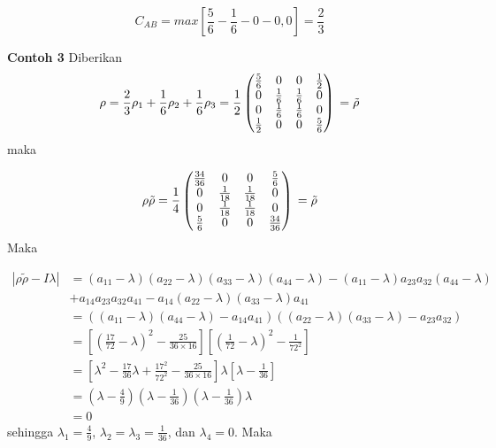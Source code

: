 \begin{equation}
	C_{AB}=max[\frac{5}{6}-\frac{1}{6}-0-0,0]=\frac{2}{3}
\end{equation}

\textbf{Contoh 3}
Diberikan
\begin{equation}
	\rho = \frac{2}{3}\rho_1 + \frac{1}{6}\rho_2
	+\frac{1}{6}\rho_3\\
	=\frac{1}{2}
	\begin{pmatrix}
		\frac{5}{6}&0&0&\frac{1}{2}\\
		0&\frac{1}{6}&\frac{1}{6}&0\\
		0&\frac{1}{6}&\frac{1}{6}&0\\
		\frac{1}{2}&0&0&\frac{5}{6}
	\end{pmatrix}\\
	=\tilde{\rho}
\end{equation}
maka 

\begin{equation}
	\rho \tilde{\rho} =\frac{1}{4}
	\begin{pmatrix}
		\frac{34}{36}&0&0&\frac{5}{6}\\
		0&\frac{1}{18}&\frac{1}{18}&0\\
		0&\frac{1}{18}&\frac{1}{18}&0\\
		\frac{5}{6}&0&0&\frac{34}{36}
	\end{pmatrix}\\
	=\tilde{\rho}
\end{equation}
Maka

\begin{equation}
	\begin{aligned}
		|\rho \tilde{\rho}-I\lambda|
		&=(a_{11}-\lambda)(a_{22}-\lambda)(a_{33}-\lambda)(a_{44}-\lambda)-(a_{11}-\lambda)a_{23}a_{32}(a_{44}-\lambda)\\
		&+a_{14}a_{23}a_{32}a_{41}-a_{14}(a_{22}-\lambda)(a_{33}-\lambda)a_{41}\\
		&=((a_{11}-\lambda)(a_{44}-\lambda)-a_{14}a_{41})((a_{22}-\lambda)(a_{33}-\lambda)-a_{23}a_{32})\\
		&=[(\frac{17}{72}-\lambda)^2-\frac{25}{36\times16}][(\frac{1}{72}-\lambda)^2-\frac{1}{72^2}]\\
		&=[\lambda^2-\frac{17}{36}\lambda+\frac{17^2}{72^2}-\frac{25}{36\times16}]\lambda[\lambda-\frac{1}{36}]\\
		&=(\lambda-\frac{4}{9})(\lambda-\frac{1}{36})(\lambda-\frac{1}{36})\lambda\\
		&=0
	\end{aligned}
\end{equation}
sehingga $\lambda_1=\frac{4}{9}$, $\lambda_2=\lambda_3=\frac{1}{36}$, dan $
\lambda_4=0$. Maka

